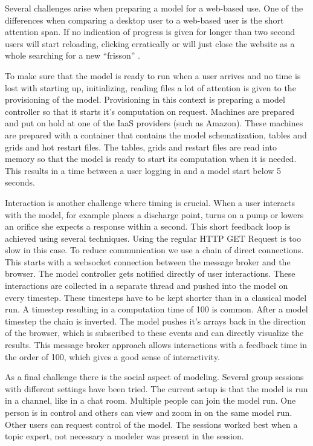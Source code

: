 \documentclass[a4paper]{article}
\begin{document}
Several challenges arise when preparing a model for a web-based use. One of the differences when comparing a desktop user to a web-based user is the short attention span. If no indication of progress is given for longer than two second users will start reloading, clicking erratically or will just close the website as a whole searching for a new ``frisson'' \citep{Carr2011}.

To make sure that the model is ready to run when a user arrives and no time is lost with starting up, initializing, reading files a lot of attention is given to the provisioning of the model. Provisioning in this context is preparing a model controller so that it starts it's computation on request. Machines are prepared and put on hold at one of the \ac{IaaS} providers (such as Amazon). These machines are prepared with a container that contains the model schematization, tables and grids and hot restart files. The tables, grids and restart files are read into memory so that the model is ready to start its computation when it is needed. This results in a time between a user logging in and a model start below 5 seconds.

Interaction is another challenge where timing is crucial. When a user interacts with the model, for example places a discharge point, turns on a pump or lowers an orifice she expects a response within a second. This short feedback loop is achieved using several techniques. Using the regular \ac{HTTP} GET Request is too slow in this case. To reduce communication we use a chain of direct connections. This starts with a websocket \citep{w3c2010} connection between the message broker and the browser. The model controller gets notified directly of user interactions. These interactions are collected in a separate thread and pushed into the model on every timestep. These timesteps have to be kept shorter than in a classical model run. A timestep resulting in a computation time of \si{100}{\mili\second} is common. After a model timestep the chain is inverted. The model pushes it's arrays back in the direction of the browser, which is subscribed to these events and can directly visualize the results. This message broker approach allows interactions with a feedback time in the order of \si{100}{\mili\second}, which gives a good sense of interactivity.

As a final challenge there is the social aspect of modeling. Several group sessions with different settings have been tried. The current setup is that the model is run in a channel, like in a chat room. Multiple people can join the model run. One person is in control and others can view and zoom in on the same model run. Other users can request control of the model. The sessions worked best when a topic expert, not necessary a modeler was present in the session.
\end{document}
